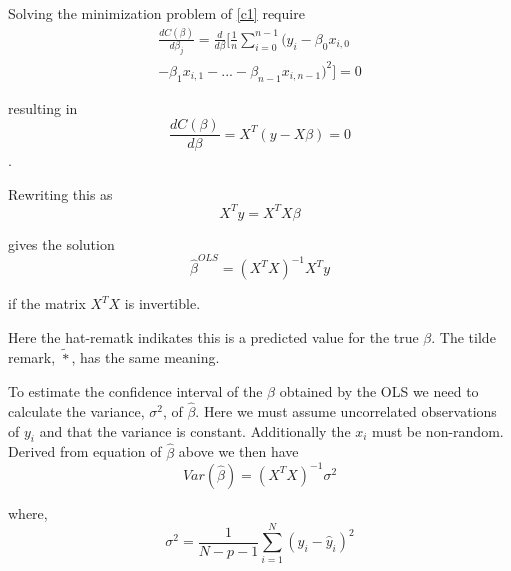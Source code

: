 \documentclass[a4paper,11pt,twocolumn]{article}
\begin{document}





Solving the minimization problem of \eqref{c1} require 
\begin{equation}
\begin{multlined}
\frac{dC(\beta)}{d\beta_j}= \frac{d}{d\beta}[\frac{1}{n}\sum\limits_{i=0}^{n-1}(y_i-\beta_0x_{i,0}\\-\beta_1x_{i,1}-...-\beta_{n-1}x_{i,n-1})^2] = 0
\end{multlined}
\end{equation}

resulting in 
\begin{equation}
\frac{dC(\beta)}{d\beta}=X^T(y-X\beta)=0
\end{equation}
.

Rewriting this as 
\begin{equation}
X^Ty=X^TX\beta
\end{equation}

gives the solution 
\begin{equation}
\hat{\beta}^{OLS}=(X^TX)^{-1}X^Ty
\end{equation}
	
if the matrix $X^TX$ is invertible.\cite{slides}

Here the hat-rematk indikates this is a predicted value for the true $\beta$. The tilde remark, $\tilde{*}$, has the same meaning. 

To estimate the confidence interval of the $\beta$ obtained by the OLS we need to calculate the variance, $\sigma^2$, of $\hat{\beta}$. Here we must assume uncorrelated observations of $y_i$ and that the variance is constant. Additionally the $x_i$ must be non-random. Derived from equation of $\hat{\beta}$ above we then have\cite{Hastie}
\begin{equation}
Var(\hat{\beta})=(X^TX)^{-1}\sigma ^2 
\end{equation}

where,
\begin{equation}
\label{s1}
\sigma ^2 = \frac{1}{N-p-1} \sum\limits_{i=1}^N (y_i-\hat{y}_i)^2
\end{equation}
\end{document}
